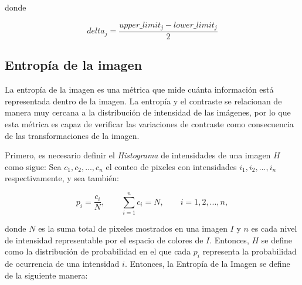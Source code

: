 donde


\begin{equation}
delta_j=\frac{upper\_limit_j - lower\_limit_j}{2}
\end{equation}


\subsection{Entropía de la imagen}

La entropía de la imagen \cite{108593} es una métrica que mide cuánta información está representada dentro de la imagen. La entropía y el contraste se relacionan de manera muy cercana a la distribución de intensidad de las imágenes, por lo que esta métrica es capaz de verificar las variaciones de contraste como consecuencia de las transformaciones de la imagen.


Primero, es necesario definir el \textit{Histograma} de intensidades de una imagen $H$ como sigue: Sea $c_1, c_2, ..., c_n$ el conteo de pixeles con intensidades $i_1, i_2, ..., i_n$ respectivamente, y sea también:


\begin{equation}
p_i=\frac{c_i}{N}, \qquad \sum_{i=1}^n c_i = N, \qquad i= 1,2, ..., n,
\end{equation}

donde $N$ es la suma total de pixeles mostrados en una imagen $I$ y $n$ es cada nivel de intensidad representable por el espacio de colores de $I$. Entonces, $H$ se define como la distribución de probabilidad en el que cada $p_i$ representa la probabilidad de ocurrencia de una intensidad $i$. Entonces, la Entropía de la Imagen se define de la siguiente manera:


